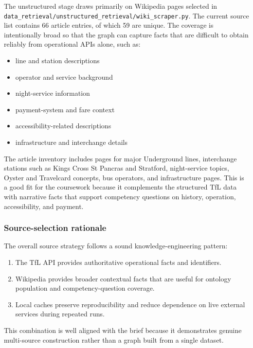 \documentclass[
  11pt,
  a4paper,
]{article}
\providecommand{\tightlist}{%
  \setlength{\itemsep}{0pt}\setlength{\parskip}{0pt}}
\begin{document}
The unstructured stage draws primarily on Wikipedia pages selected in
\texttt{data\_retrieval/unstructured\_retrieval/wiki\_scraper.py}. The
current source list contains 66 article entries, of which 59 are unique.
The coverage is intentionally broad so that the graph can capture facts
that are difficult to obtain reliably from operational APIs alone, such
as:

\begin{itemize}
\tightlist
\item
  line and station descriptions
\item
  operator and service background
\item
  night-service information
\item
  payment-system and fare context
\item
  accessibility-related descriptions
\item
  infrastructure and interchange details
\end{itemize}

The article inventory includes pages for major Underground lines,
interchange stations such as King\textquotesingle s Cross St Pancras and
Stratford, night-service topics, Oyster and Travelcard concepts, bus
operators, and infrastructure pages. This is a good fit for the
coursework because it complements the structured TfL data with narrative
facts that support competency questions on history, operation,
accessibility, and payment.

\subsubsection{Source-selection
rationale}\label{source-selection-rationale}

The overall source strategy follows a sound knowledge-engineering
pattern:

\begin{enumerate}
\def\labelenumi{\arabic{enumi}.}
\tightlist
\item
  The TfL API provides authoritative operational facts and identifiers.
\item
  Wikipedia provides broader contextual facts that are useful for
  ontology population and competency-question coverage.
\item
  Local caches preserve reproducibility and reduce dependence on live
  external services during repeated runs.
\end{enumerate}

This combination is well aligned with the brief because it demonstrates
genuine multi-source construction rather than a graph built from a
single dataset.
\end{document}
